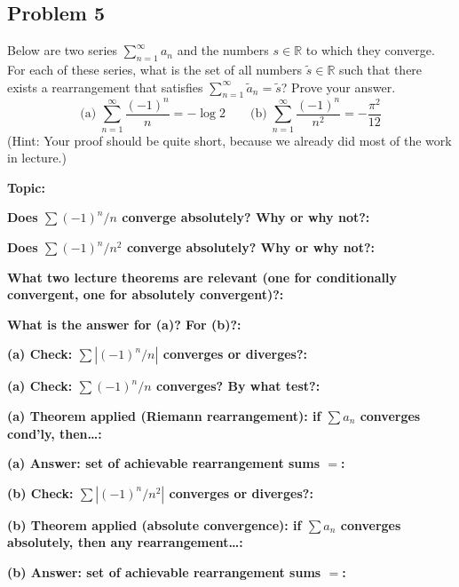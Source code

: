 \documentclass[12pt]{article}
\newcommand{\fillfield}[1]{%
  \par\noindent\textbf{#1:}\enspace\hrulefill\par\vspace{3pt}%
}
\begin{document}
\subsection{Problem 5}

\begin{tcolorbox}[
  enhanced, breakable,
  colback  = probblue,
  colframe = blue!55!black,
  fonttitle = \bfseries,
  title = {\textsc{Problem Statement}\hfill Homework 7, Problem 5}
]
Below are two series $\sum_{n=1}^{\infty} a_n$ and the numbers $s \in \mathbb{R}$ to which
they converge.
For each of these series, what is the set of all numbers $\tilde{s} \in \mathbb{R}$ such
that there exists a rearrangement that satisfies $\sum_{n=1}^{\infty} \tilde{a}_n = \tilde{s}$?
Prove your answer.
\[
  \text{(a)}\;\sum_{n=1}^{\infty}\frac{(-1)^n}{n} = -\log 2
  \qquad
  \text{(b)}\;\sum_{n=1}^{\infty}\frac{(-1)^n}{n^2} = -\frac{\pi^2}{12}
\]
(Hint: Your proof should be quite short, because we already did most of the work in
lecture.)
\end{tcolorbox}

\bigskip

\begin{tcolorbox}[
  enhanced, breakable,
  colback  = pass1green,
  colframe = green!55!black,
  fonttitle = \bfseries,
  title = {Pass 1 \enspace\textbf{--}\enspace First Diagnosis}
]
\fillfield{Topic}
\fillfield{Does $\sum (-1)^n/n$ converge absolutely? Why or why not?}
\fillfield{Does $\sum (-1)^n/n^2$ converge absolutely? Why or why not?}
\fillfield{What two lecture theorems are relevant (one for conditionally convergent, one for absolutely convergent)?}
\fillfield{What is the answer for (a)? For (b)?}
\end{tcolorbox}

\bigskip

\begin{tcolorbox}[
  enhanced, breakable,
  colback  = pass2yellow,
  colframe = yellow!65!black,
  fonttitle = \bfseries,
  title = {Pass 2 \enspace\textbf{--}\enspace Proof Recipe Card}
]
\fillfield{(a) Check: $\sum|(-1)^n/n|$ converges or diverges?}
\fillfield{(a) Check: $\sum(-1)^n/n$ converges? By what test?}
\fillfield{(a) Theorem applied (Riemann rearrangement): if $\sum a_n$ converges cond'ly, then\ldots}
\fillfield{(a) Answer: set of achievable rearrangement sums $=$}
\fillfield{(b) Check: $\sum|(-1)^n/n^2|$ converges or diverges?}
\fillfield{(b) Theorem applied (absolute convergence): if $\sum a_n$ converges absolutely, then any rearrangement\ldots}
\fillfield{(b) Answer: set of achievable rearrangement sums $=$}
\end{tcolorbox}
\end{document}
